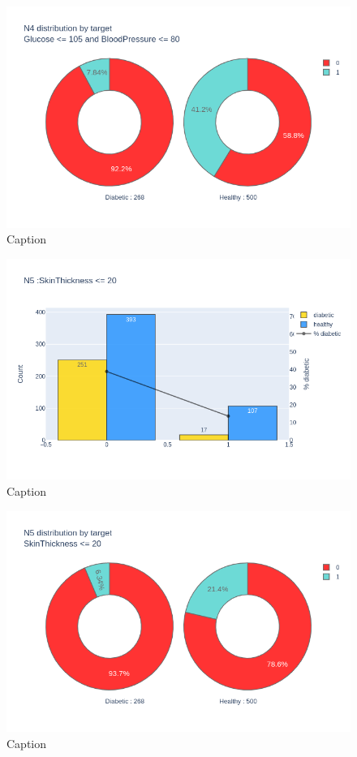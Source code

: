 \documentclass[12pt]{article}
\begin{document}
\begin{figure}[ht]
\centering
\includegraphics[width=1\textwidth]{newplot(22).png}
\caption{\label{fig:32} Caption}
\end{figure}

\begin{figure}[ht]
\centering
\includegraphics[width=1\textwidth]{newplot(23).png}
\caption{\label{fig:33} Caption}
\end{figure}

\begin{figure}[ht]
\centering
\includegraphics[width=1\textwidth]{newplot(24).png}
\caption{\label{fig:34} Caption}
\end{figure}
\end{document}

